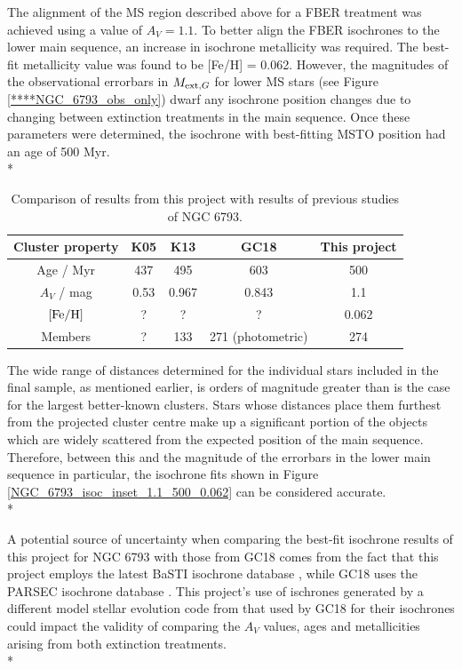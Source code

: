\documentclass[12pt, a4paper]{report}
\begin{document}
The alignment of the MS region described above for a FBER treatment was achieved using a value of $A_{V} = 1.1$. To better align the FBER isochrones to the lower main sequence, an increase in isochrone metallicity was required. The best-fit metallicity value was found to be [Fe/H] = 0.062. However, the magnitudes of the observational errorbars in $M_{\textnormal{ext},G}$ for lower MS stars (see Figure \ref{****NGC_6793_obs_only}) dwarf any isochrone position changes due to changing between extinction treatments in the main sequence. Once these parameters were determined, the isochrone with best-fitting MSTO position had an age of 500 Myr.\\*


\begin{table}
\begin{center}
\begin{tabular}{ccccc}
\hline
Cluster property & K05 & K13 & GC18 & This project \\
\hline
Age / Myr & 437 & 495 & 603 & 500 \\
$A_{V}$ / mag & 0.53 & 0.967 & 0.843 & 1.1 \\
$\textnormal{[Fe/H]}$ & ? & ? & ? & 0.062 \\
Members & ? & 133 & 271 (photometric) & 274 \\
\hline
\end{tabular}
\caption{Comparison of results from this project with results of previous studies of NGC 6793.}
\label{NGC6793_result}
\end{center}
\end{table}

The wide range of distances determined for the individual stars included in the final sample, as mentioned earlier, is orders of magnitude greater than is the case for the largest better-known clusters. Stars whose distances place them furthest from the projected cluster centre make up a significant portion of the objects which are widely scattered from the expected position of the main sequence. Therefore, between this and the magnitude of the errorbars in the lower main sequence in particular, the isochrone fits shown in Figure \ref{NGC_6793_isoc_inset_1.1_500_0.062} can be considered accurate. \\*

A potential source of uncertainty when comparing the best-fit isochrone results of this project for NGC 6793 with those from GC18 comes from the fact that this project employs the latest BaSTI isochrone database \citep{2018ApJ...856..125H}, while GC18 uses the PARSEC isochrone database \citep{2017ApJ...835...77M}. This project's use of ischrones generated by a different model stellar evolution code from that used by GC18 for their isochrones could impact the validity of comparing the $A_{V}$ values, ages and metallicities arising from both extinction treatments.\\*
\end{document}
